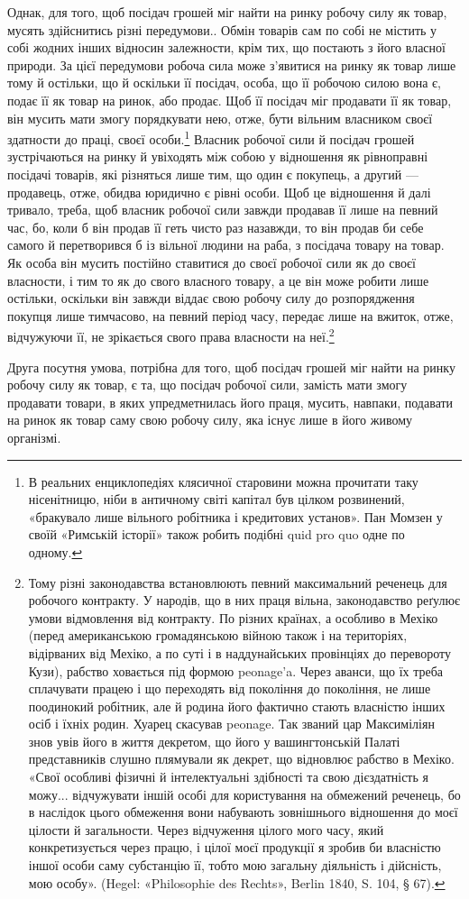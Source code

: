 Однак, для того, щоб посідач грошей міг найти на ринку
робочу силу як товар, мусять здійснитись різні передумови..
Обмін товарів сам по собі не містить у собі жодних інших відносин
залежности, крім тих, що постають з його власної природи.
За цієї передумови робоча сила може з’явитися на ринку як
товар лише тому й остільки, що й оскільки її посідач, особа, що
її робочою силою вона є, подає її як товар на ринок, або продає.
Щоб її посідач міг продавати її як товар, він мусить мати змогу
порядкувати нею, отже, бути вільним власником своєї здатности
до праці, своєї особи.\footnote{
В реальних енциклопедіях клясичної старовини можна прочитати
таку нісенітницю, ніби в античному світі капітал був цілком розвинений,
«бракувало лише вільного робітника і кредитових установ». Пан Момзен
у своїй «Римській історії» також робить подібні quid pro quo одне
по одному.
} Власник робочої сили й посідач грошей
зустрічаються на ринку й увіходять між собою у відношення
як рівноправні посідачі товарів, які різняться лише тим, що
один є покупець, а другий — продавець, отже, обидва юридично
є рівні особи. Щоб це відношення й далі тривало, треба, щоб
власник робочої сили завжди продавав її лише на певний час,
бо, коли б він продав її геть чисто раз назавжди, то він продав би
себе самого й перетворився б із вільної людини на раба, з посідача
товару на товар. Як особа він мусить постійно ставитися до
своєї робочої сили як до своєї власности, і тим то як до свого
власного товару, а це він може робити лише остільки, оскільки
він завжди віддає свою робочу силу до розпорядження покупця
лише тимчасово, на певний період часу, передає лише на вжиток,
отже, відчужуючи її, не зрікається свого права власности
на неї.\footnote{
Тому різні законодавства встановлюють певний максимальний реченець
для робочого контракту. У народів, що в них праця вільна, законодавство
реґулює умови відмовлення від контракту. По різних країнах, а особливо
в Мехіко (перед американською громадянською війною також і на територіях,
відірваних від Мехіко, а по суті і в наддунайських провінціях до
перевороту Кузи), рабство ховається під формою peonage’a. Через аванси,
що їх треба сплачувати працею і що переходять від покоління до покоління,
не лише поодинокий робітник, але й родина його фактично стають
власністю інших осіб і їхніх родин. Хуарец скасував peonage. Так званий
цар Максиміліян знов увів його в життя декретом, що його у вашингтонській
Палаті представників слушно плямували як декрет, що відновлює
рабство в Мехіко. «Свої особливі фізичні й інтелектуальні здібності та
свою дієздатність я можу... відчужувати іншій особі для користування
на обмежений реченець, бо в наслідок цього обмеження вони набувають
зовнішнього відношення до моєї цілости й загальности. Через відчуження
цілого мого часу, який конкретизується через працю, і цілої моєї продукції
я зробив би власністю іншої особи саму субстанцію її, тобто мою загальну
діяльність і дійсність, мою особу». (Hegel: «Philosophie des Rechts», Berlin
1840, S. 104, § 67).
}

Друга посутня умова, потрібна для того, щоб посідач грошей
міг найти на ринку робочу силу як товар, є та, що посідач робочої
сили, замість мати змогу продавати товари, в яких упредметнилась
його праця, мусить, навпаки, подавати на ринок як товар
саму свою робочу силу, яка існує лише в його живому організмі.